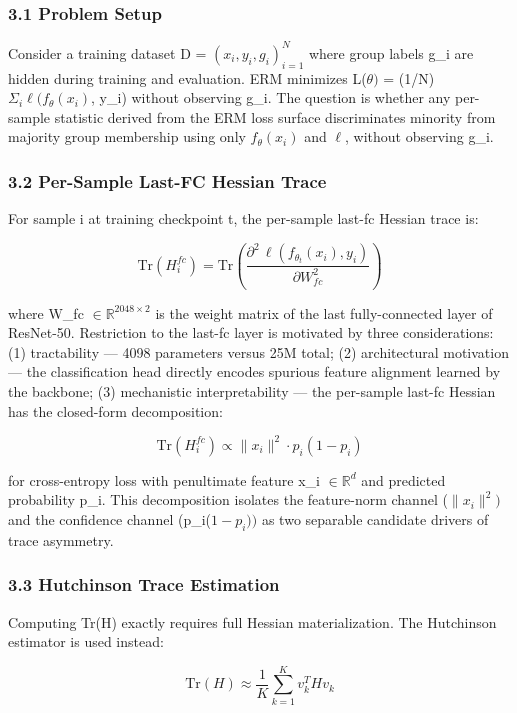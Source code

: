 
\subsubsection{3.1 Problem Setup}

Consider a training dataset D = ${(x_i, y_i, g_i)}_{i=1}^N$ where group labels g\_i are hidden during training and evaluation. ERM minimizes L($\theta )$ = (1/N)$\Sigma _i \ell (f_\theta (x_{i})$, y\_i) without observing g\_i. The question is whether any per-sample statistic derived from the ERM loss surface discriminates minority from majority group membership using only $f_{\theta}(x_{i})$ and $\ell$, without observing g\_i.

\subsubsection{3.2 Per-Sample Last-FC Hessian Trace}

For sample i at training checkpoint t, the per-sample last-fc Hessian trace is:

$$\mathrm{Tr}(H_i^{fc}) = \mathrm{Tr}\!\left(\frac{\partial^2\,\ell(f_{\theta_t}(x_i), y_i)}{\partial W_{fc}^2}\right)$$

where W\_fc $\in \mathbb{R}^{2048\times 2}$ is the weight matrix of the last fully-connected layer of ResNet-50. Restriction to the last-fc layer is motivated by three considerations: (1) tractability --- 4098 parameters versus 25M total; (2) architectural motivation --- the classification head directly encodes spurious feature alignment learned by the backbone; (3) mechanistic interpretability --- the per-sample last-fc Hessian has the closed-form decomposition:

$$\mathrm{Tr}(H_i^{fc}) \propto \|x_i\|^2 \cdot p_i(1 - p_i)$$

for cross-entropy loss with penultimate feature x\_i $\in \mathbb{R}^d$ and predicted probability p\_i. This decomposition isolates the feature-norm channel ($\|x_{i}\|^{2})$ and the confidence channel (p\_i($1-p_{i}))$ as two separable candidate drivers of trace asymmetry.

\subsubsection{3.3 Hutchinson Trace Estimation}

Computing Tr(H) exactly requires full Hessian materialization. The Hutchinson estimator \citep{avron2011randomized} is used instead:

$$\mathrm{Tr}(H) \approx \frac{1}{K} \sum_{k=1}^K v_k^T H v_k$$

